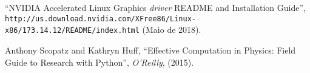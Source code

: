 \documentclass[twoside,a4paper,12pt,english]{inac17}
\begin{document}
\begin{thebibliography}{99} %

 ``NVIDIA Accelerated Linux Graphics \textit{driver} README and Installation Guide'', \\\verb#http://us.download.nvidia.com/XFree86/Linux-x86/173.14.12/README/index.html# (Maio de 2018).

 Anthony Scopatz and Kathryn Huff, ``Effective Computation in Physics: Field Guide to Research with Python'', \textit{O'Reilly}, (2015).



  

  


  
  

\end{thebibliography}
\end{document}
